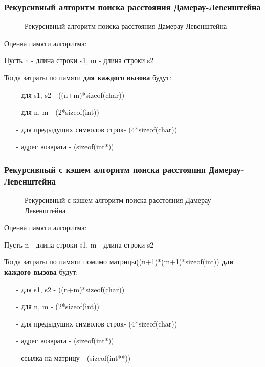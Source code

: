 \subsubsection{Рекурсивный алгоритм поиска расстояния Дамерау-Левенштейна}
\begin{figure}[h]
	\centering
	
	\label{fig:d31}
\end{figure}
\begin{figure}[h]
	\centering
	
	\caption{Рекурсивный алгоритм поиска расстояния Дамерау-Левенштейна}
	\label{fig:d32}
\end{figure}
\pagebreak
Оценка памяти алгоритма:\par
Пусть n - длина строки s1, m - длина строки s2\par
Тогда затраты по памяти \textbf{для каждого вызова} будут:\par
\begin{itemize}
	\item[-] для s1, s2 - ((n+m)*sizeof(char))
	\item[-] для n, m - (2*sizeof(int))
	\item[-] для предыдущих символов строк- (4*sizeof(char))
	\item[-] адрес возврата - (sizeof(int*))
\end{itemize}
\pagebreak

\subsubsection{Рекурсивный с кэшем алгоритм поиска расстояния Дамерау-Левенштейна}
\begin{figure}[h]
	\centering
	
	\label{fig:d41}
\end{figure}
\begin{figure}[h]
	\centering
	
	\caption{Рекурсивный с кэшем алгоритм поиска расстояния Дамерау-Левенштейна}
	\label{fig:d42}
\end{figure}
\pagebreak
Оценка памяти алгоритма:\par
Пусть n - длина строки s1, m - длина строки s2\par
Тогда затраты по памяти помимо матрицы((n+1)*(m+1)*sizeof(int)) \textbf{для каждого вызова} будут:\par
\begin{itemize}
	\item[-] для s1, s2 - ((n+m)*sizeof(char))
	\item[-] для n, m - (2*sizeof(int))
	\item[-] для предыдущих символов строк- (4*sizeof(char))
	\item[-] адрес возврата - (sizeof(int*))
	\item[-] ссылка на матрицу - (sizeof(int**))
\end{itemize}
\pagebreak